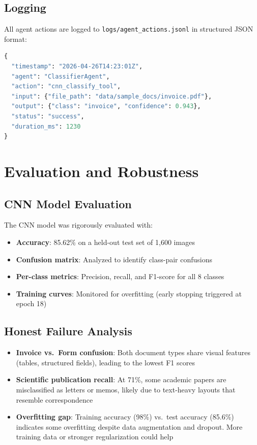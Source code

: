 \documentclass[12pt,a4paper]{article}
\begin{document}
\subsection{Logging}
All agent actions are logged to \texttt{logs/agent\_actions.jsonl} in structured JSON format:

\begin{lstlisting}[language=Python, caption=Example log entry]
{
  "timestamp": "2026-04-26T14:23:01Z",
  "agent": "ClassifierAgent",
  "action": "cnn_classify_tool",
  "input": {"file_path": "data/sample_docs/invoice.pdf"},
  "output": {"class": "invoice", "confidence": 0.943},
  "status": "success",
  "duration_ms": 1230
}
\end{lstlisting}

\section{Evaluation and Robustness}

\subsection{CNN Model Evaluation}
The CNN model was rigorously evaluated with:
\begin{itemize}
    \item \textbf{Accuracy}: 85.62\% on a held-out test set of 1,600 images
    \item \textbf{Confusion matrix}: Analyzed to identify class-pair confusions
    \item \textbf{Per-class metrics}: Precision, recall, and F1-score for all 8 classes
    \item \textbf{Training curves}: Monitored for overfitting (early stopping triggered at epoch 18)
\end{itemize}

\subsection{Honest Failure Analysis}
\begin{itemize}
    \item \textbf{Invoice vs.\ Form confusion}: Both document types share visual features (tables, structured fields), leading to the lowest F1 scores
    \item \textbf{Scientific publication recall}: At 71\%, some academic papers are misclassified as letters or memos, likely due to text-heavy layouts that resemble correspondence
    \item \textbf{Overfitting gap}: Training accuracy (98\%) vs.\ test accuracy (85.6\%) indicates some overfitting despite data augmentation and dropout. More training data or stronger regularization could help
\end{itemize}
\end{document}
